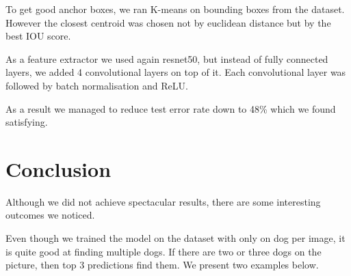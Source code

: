 \documentclass{article}
\begin{document}
To get good anchor boxes, we ran K-means on bounding boxes from the dataset. However the closest centroid was chosen not by euclidean distance but by the best IOU score. 

As a feature extractor we used again resnet50, but instead of fully connected layers, we added 4 convolutional layers on top of it. Each convolutional layer was followed by batch normalisation and ReLU.

As a result we managed to reduce test error rate down to 48\% which we found satisfying.


\section*{Conclusion}

Although we did not achieve spectacular results, there are some interesting outcomes we noticed.

Even though we trained the model on the dataset with only on dog per image, it is quite good at finding multiple dogs. If there are two or three dogs on the picture, then top 3 predictions find them. We present two examples below.
\end{document}
